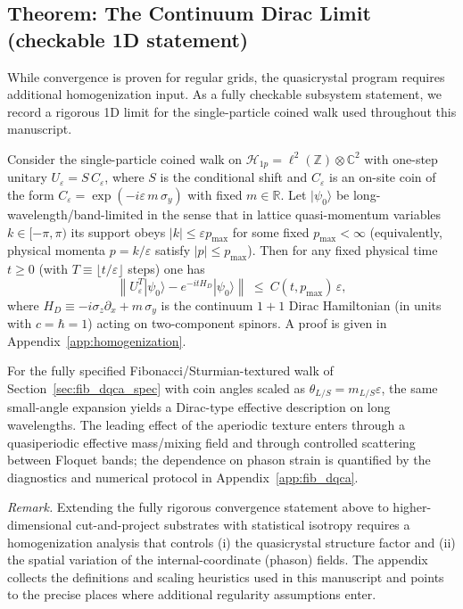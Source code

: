 \subsection{Theorem: The Continuum Dirac Limit (checkable 1D statement)}
While convergence is proven for regular grids, the quasicrystal program requires additional homogenization input. As a fully checkable subsystem statement, we record a rigorous 1D limit for the single-particle coined walk used throughout this manuscript.
\begin{theorem}
\label{prop:dirac_limit}
Consider the single-particle coined walk on $\mathcal{H}_{1p}=\ell^2(\mathbb{Z})\otimes\mathbb{C}^2$ with one-step unitary $U_\varepsilon=S\,C_\varepsilon$, where $S$ is the conditional shift and $C_\varepsilon$ is an on-site coin of the form $C_\varepsilon=\exp(-i\varepsilon\,m\,\sigma_y)$ with fixed $m\in\mathbb{R}$. Let $|\psi_0\rangle$ be long-wavelength/band-limited in the sense that in lattice quasi-momentum variables $k\in[-\pi,\pi)$ its support obeys $|k|\le \varepsilon p_{\max}$ for some fixed $p_{\max}<\infty$ (equivalently, physical momenta $p=k/\varepsilon$ satisfy $|p|\le p_{\max}$).
Then for any fixed physical time $t\ge 0$ (with $T\equiv \lfloor t/\varepsilon\rfloor$ steps) one has
\begin{equation}
    \left\|U_\varepsilon^{T}|\psi_0\rangle-e^{-itH_D}|\psi_0\rangle\right\|\ \le\ C(t,p_{\max})\,\varepsilon,
\end{equation}
where $H_D\equiv -i\sigma_z\partial_x+m\,\sigma_y$ is the continuum $1{+}1$ Dirac Hamiltonian (in units with $c=\hbar=1$) acting on two-component spinors. A proof is given in Appendix~\ref{app:homogenization}.
\end{theorem}
\begin{corollary}
For the fully specified Fibonacci/Sturmian-textured walk of Section~\ref{sec:fib_dqca_spec} with coin angles scaled as $\theta_{L/S}=m_{L/S}\varepsilon$, the same small-angle expansion yields a Dirac-type effective description on long wavelengths. The leading effect of the aperiodic texture enters through a quasiperiodic effective mass/mixing field and through controlled scattering between Floquet bands; the dependence on phason strain is quantified by the diagnostics and numerical protocol in Appendix~\ref{app:fib_dqca}.
\end{corollary}
\textit{Remark.} Extending the fully rigorous convergence statement above to higher-dimensional cut-and-project substrates with statistical isotropy requires a homogenization analysis that controls (i) the quasicrystal structure factor and (ii) the spatial variation of the internal-coordinate (phason) fields. The appendix collects the definitions and scaling heuristics used in this manuscript and points to the precise places where additional regularity assumptions enter.

